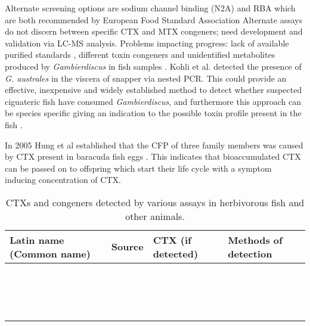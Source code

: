 \documentclass[12pt]{article}
\begin{document}
Alternate screening options are sodium channel binding (N2A) \cite{dickey2010ciguatera} and RBA \cite{poli1997identification,darius2007ciguatera} which are both recommended by European Food Standard Association \cite{} %
Alternate assays do not discern between specific CTX and MTX congeners; need development and validation via LC-MS analysis. Problems impacting progress: lack of available purified standards \cite{}, different toxin congeners and unidentified metabolites produced by \emph{Gambierdiscus} in fish samples \cite{endean1993variation,vernoux1997isolation}.
Kohli et al. detected the presence of \emph{G. australes} in the viscera of snapper via nested PCR. This could provide an effective, inexpensive and widely established method to detect whether suspected ciguateric fish have consumed \emph{Gambierdiscus}, and furthermore this approach can be species specific giving an indication to the possible toxin profile present in the fish \cite{kohli2014feeding}. 

In 2005 Hung et al established that the CFP of three family members was caused by CTX present in baracuda fish eggs \cite{hung2005persistent}. This indicates that bioaccumulated CTX can be passed on to offspring which start their life cycle with a symptom inducing concentration of CTX.

\begin{sidewaystable}[!htbp]
\caption{CTXs and congeners detected by various assays in herbivorous fish and other animals.}
\begin{tabular}{ |  p{4.5cm} | p{5cm} | p{4.5cm} | p{5cm} | }
\hline
\textbf{Latin name (Common name)} & \textbf{Source} & \textbf{CTX (if detected)} & \textbf{Methods of detection} \\
\hline
  &  &  & \\
\hline
  &  &  & \\
\hline
  &  &  & \\
\hline
  &  &  & \\
\hline
  &  &  & \\
\hline
  &  &  & \\
\hline
  &  &  & \\
\hline
  &  &  & \\
\hline
  &  &  & \\
\hline
  &  &  & \\
\hline
  &  &  & \\
\hline
  &  &  & \\
\hline
  &  &  & \\
\hline
  &  &  & \\
\hline
  &  &  & \\
\hline
  &  &  & \\
\hline
\end{tabular}
\end{sidewaystable}
\end{document}
